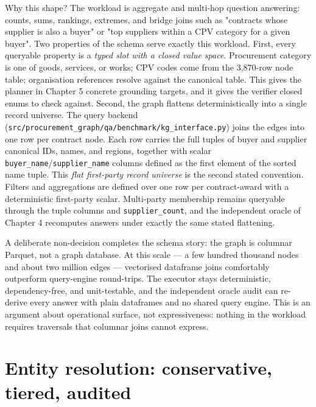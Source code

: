 Why this shape? The workload is aggregate and multi-hop question answering: counts, sums, rankings, extremes, and bridge joins such as "contracts whose supplier is also a buyer" or "top suppliers within a CPV category for a given buyer". Two properties of the schema serve exactly this workload. First, every queryable property is a \emph{typed slot with a closed value space}. Procurement category is one of goods, services, or works; CPV codes come from the 3,870-row node table; organisation references resolve against the canonical table. This gives the planner in Chapter 5 concrete grounding targets, and it gives the verifier closed enums to check against. Second, the graph flattens deterministically into a single record universe. The query backend (\texttt{src/procurement\_graph/qa/benchmark/kg\_interface.py}) joins the edges into one row per contract node. Each row carries the full tuples of buyer and supplier canonical IDs, names, and regions, together with scalar \texttt{buyer\_name}/\texttt{supplier\_name} columns defined as the first element of the sorted name tuple. This \emph{flat first-party record universe} is the second stated convention. Filters and aggregations are defined over one row per contract-award with a deterministic first-party scalar. Multi-party membership remains queryable through the tuple columns and \texttt{supplier\_count}, and the independent oracle of Chapter 4 recomputes answers under exactly the same stated flattening.

A deliberate non-decision completes the schema story: the graph is columnar Parquet, not a graph database. At this scale --- a few hundred thousand nodes and about two million edges --- vectorised dataframe joins comfortably outperform query-engine round-trips. The executor stays deterministic, dependency-free, and unit-testable, and the independent oracle audit can re-derive every answer with plain dataframes and no shared query engine. This is an argument about operational surface, not expressiveness: nothing in the workload requires traversals that columnar joins cannot express.

\section{Entity resolution: conservative, tiered, audited}\label{sec:entity-resolution-conservative-tiered-au}

